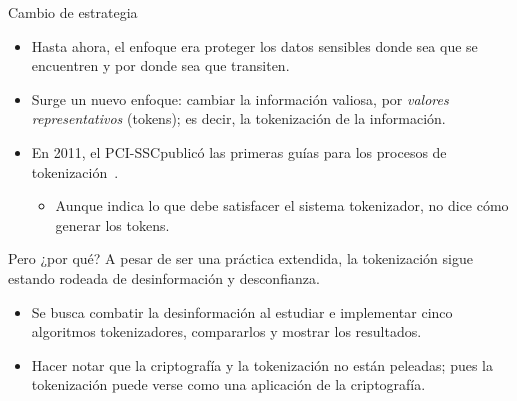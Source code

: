 \begin{frame}{Cambio de estrategia}
  \begin{itemize}
    \item Hasta ahora, el enfoque era proteger los datos sensibles donde sea
      que se encuentren y por donde sea que transiten.
    \item Surge un nuevo enfoque: cambiar la información valiosa, por
      \textit{valores representativos} (tokens); es decir, la tokenización
      de la información.
    \item En 2011, el PCI-SSC\footnotemark publicó las primeras guías para los
      procesos de tokenización~\cite{pci_tokens}.
      \begin{itemize}
        \item Aunque indica lo que debe satisfacer el sistema tokenizador,
          no dice cómo generar los tokens.
      \end{itemize}
  \end{itemize}
\end{frame}

\begin{frame}{Pero ¿por qué?}
  A pesar de ser una práctica extendida, la tokenización sigue estando
  rodeada de desinformación y desconfianza.
  \begin{itemize}
    \item Se busca combatir la desinformación al estudiar e implementar cinco
      algoritmos tokenizadores, compararlos y mostrar los resultados.
    \item Hacer notar que la criptografía y la tokenización no están peleadas;
      pues la tokenización puede verse como una aplicación de la criptografía.
  \end{itemize}
\end{frame}
